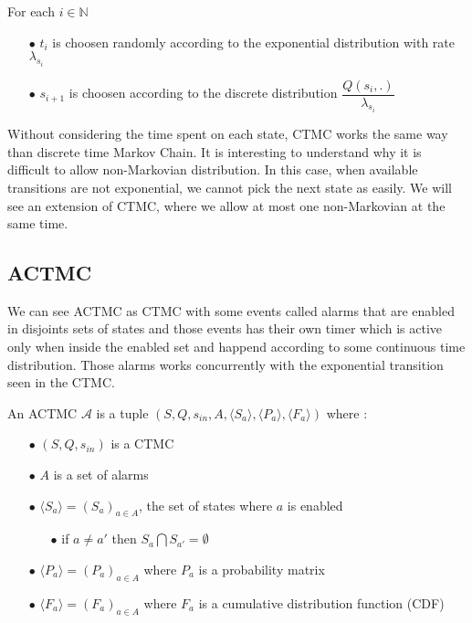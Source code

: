 For each $i \in \mathbb{N}$ \begin{itemize}
	\item[$\bullet$] $t_i$ is choosen randomly according to the exponential distribution with rate $\lambda_{s_i}$
	\item[$\bullet$] $s_{i+1}$ is choosen according to the discrete distribution $\dfrac{Q(s_i,.)}{\lambda_{s_i}}$
\end{itemize}

Without considering the time spent on each state, CTMC works the same way than discrete time Markov Chain. It is interesting to understand why it is difficult to allow non-Markovian distribution. In this case, when available transitions are not exponential, we cannot pick the next state as easily. We will see an extension of CTMC, where we allow at most one non-Markovian at the same time. 

\subsection{ACTMC}

We can see ACTMC as CTMC with some events called alarms that are enabled in disjoints sets of states and those events has their own timer which is active only when inside the enabled set and happend according to some continuous time distribution. Those alarms works concurrently with the exponential transition seen in the CTMC.

An ACTMC $\mathcal{A}$ is a tuple $(S,Q,s_{in},A,\langle S_a \rangle,\langle P_a \rangle,\langle F_a \rangle)$
where :
\begin{itemize}
	\item[$\bullet$]$(S,Q,s_{in})$ is a CTMC
	\item[$\bullet$] $A$ is a set of alarms
	\item[$\bullet$] $\langle S_a \rangle = (S_a)_{a \in A}$, the set of states where $a$ is enabled
		\begin{itemize}
			\item[$\bullet$] if $a \neq a'$ then $S_a \bigcap S_{a'} = \emptyset$ 
		\end{itemize}
	\item[$\bullet$]$\langle P_a \rangle = (P_a)_{a \in A}$ where $P_a$ is a probability matrix
	\item[$\bullet$]$\langle F_a \rangle = (F_a)_{a \in A}$ where $F_a$ is a cumulative distribution function (CDF) 
\end{itemize}


